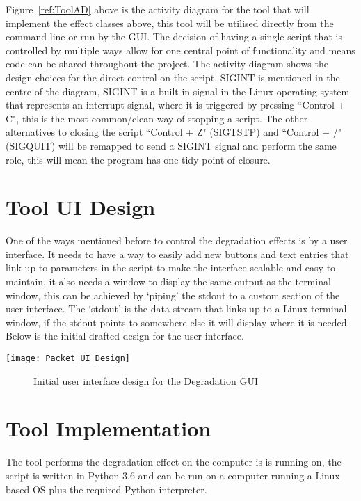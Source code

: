 Figure~\ref{ref:ToolAD} above is the activity diagram for the tool that will implement the effect classes above, this tool will be utilised directly from the command line or run by the GUI. The decision of having a single script that is controlled by multiple ways allow for one central point of functionality and means code can be shared throughout the project. The activity diagram shows the design choices for the direct control on the script. SIGINT is mentioned in the centre of the diagram, SIGINT is a built in signal in the Linux operating system that represents an interrupt signal, where it is triggered by pressing ``Control + C", this is the most common/clean way of stopping a script. The other alternatives to closing the script ``Control + Z" (SIGTSTP) and ``Control + /" (SIGQUIT) will be remapped to send a SIGINT signal and perform the same role, this will mean the program has one tidy point of closure.

%
\section{Tool UI Design}
One of the ways mentioned before to control the degradation effects is by a user interface. It needs to have a way to easily add new buttons and text entries that link up to parameters in the script to make the interface scalable and easy to maintain, it also needs a window to display the same output as the terminal window, this can be achieved by `piping' the stdout to a custom section of the user interface. The `stdout' is the data stream that links up to a Linux terminal window, if the stdout points to somewhere else it will display where it is needed. Below is the initial drafted design for the user interface.

\begin{center}
	\texttt{[image: Packet\_UI\_Design]}
	\begin{figure}[h]
		\caption{Initial user interface design for the Degradation GUI}
	\end{figure}
\end{center}



%
\section{Tool Implementation}
The tool performs the degradation effect on the computer is is running on, the script is written in Python 3.6 \citep{pranskevichuspython} and can be run on a computer running a Linux based OS plus the required Python interpreter.


